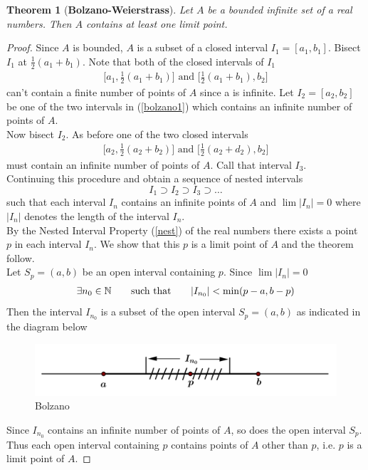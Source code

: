 \documentclass[	DIV=calc,paper=a4,fontsize=11pt]{scrartcl}	 	%
\newtheorem{thm}{Theorem}[section]
\theoremstyle{definition}
\theoremstyle{plain}
\theoremstyle{remark}
\begin{document}
\begin{thm}[\textbf{Bolzano-Weierstrass}]
Let $A$ be a bounded infinite set of a real numbers. Then $A$ contains at least one limit point.
\end{thm}
\begin{proof}
Since $A$ is bounded, $A$ is a subset of a closed interval $I_1=[a_1,b_1]$. Bisect $I_1$ at $\frac{1}{2}(a_1+b_1)$. Note that both of the closed intervals of $I_1$
\begin{align}\label{bolzano1}
\biggl[a_1, \frac{1}{2}(a_1+b_1)\biggl]\text{ and } \biggl[\frac{1}{2}(a_1+b_1),b_2\biggl]
\end{align}
can't contain a finite number of points of $A$ since a is infinite. Let $I_2=[a_2,b_2]$ be one of the two intervals in (\ref{bolzano1}) which contains an infinite number of points of $A$.\\
Now bisect $I_2$. As before one of the two closed intervals
\begin{align*}
\biggl[a_2, \frac{1}{2}(a_2+b_2)\biggl]\text{ and } \biggl[\frac{1}{2}(a_2+d_2),b_2\biggl]
\end{align*}
must contain an infinite number of points of $A$. Call that interval $I_3$. \\
Continuing this procedure and obtain a sequence of nested intervals
$$I_1\supset I_2\supset I_3\supset\ldots$$
such that each interval $I_n$ contains an infinite points of $A$ and $\lim |I_n|=0$ where $|I_n|$ denotes the length of the interval $I_n$.\\
By the Nested Interval Property (\ref{nest}) of the real numbers there exists a point $p$ in each interval $I_n$. We show that this $p$ is a limit point of $A$ and the theorem follow.\\
Let $S_p=(a,b)$ be an open interval containing $p$. Since $\lim |I_n|=0$
\begin{align*}
\exists n_0\in \Bbb N \qquad\text{such that}\qquad |I_{n_0}|<\min(p-a,b-p)
\end{align*}
Then the interval $I_{n_0}$ is a subset of the open interval $S_p=(a,b)$ as indicated in the diagram below
\begin{figure}[hbt!]
\centering
\includegraphics[width=.55\textwidth]{bolzano.png}
\caption{Bolzano}
\end{figure}

Since $I_{n_0}$ contains an infinite number of points of $A$, so does the open interval $S_p$. Thus each open interval containing $p$ contains points of $A$ other than $p$, i.e. $p$ is a limit point of $A$.
\end{proof}
\end{document}
